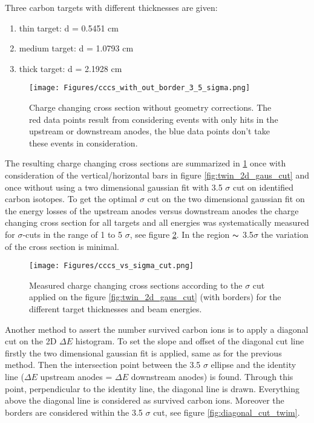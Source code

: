 Three carbon targets with different thicknesses are given:
\begin{enumerate}
\itemsep0em
\item thin target: d = 0.5451 cm
\item medium target: d = 1.0793 cm
\item thick target: d = 2.1928 cm 
\end{enumerate}
\begin{figure}[htpb]
    \centering
    \texttt{[image: Figures/cccs\_with\_out\_border\_3\_5\_sigma.png]}
    \caption{
    Charge changing cross section without geometry corrections. The red data points result from considering events with only hits in the upstream or downstream anodes, the blue data points don't take these events in consideration. 
     }
    \label{fig:cccs_with_out_border_3_5}
\end{figure}
The resulting charge changing cross sections are summarized in \ref{fig:cccs_with_out_border_3_5} once with consideration of the vertical/horizontal bars in figure \ref{fig:twin_2d_gaus_cut} and once without using a two dimensional gaussian fit with 3.5 $\sigma$ cut  on identified carbon isotopes. 
To get the optimal $\sigma$ cut on the two dimensional gaussian fit on the energy losses of the upstream anodes versus downstream anodes the charge changing cross section for all targets and all energies was systematically measured for $\sigma$-cuts in the range of 1 to 5 $\sigma$, see figure \ref{fig:cccs_vs_sigma_cut}. In the region $\thicksim$ 3.5$\sigma$ the variation of the cross section is minimal.
\begin{figure}[htpb]
    \centering
    \texttt{[image: Figures/cccs\_vs\_sigma\_cut.png]}
    \caption{
    Measured charge changing cross sections according to the $\sigma$ cut applied on the figure \ref{fig:twin_2d_gaus_cut} (with borders) for the different target thicknesses and beam energies.
     }
    \label{fig:cccs_vs_sigma_cut}
\end{figure}
Another method to assert the number survived carbon ions is to apply a diagonal cut on the 2D $\Delta E$ histogram. To set the slope and offset of the diagonal cut line firstly the two dimensional gaussian fit is applied, same as for the previous method. Then the intersection point between the 3.5 $\sigma$ ellipse and the identity line ($\Delta E$ upstream anodes = $\Delta E$ downstream anodes) is found. Through this point, perpendicular to the identity line, the diagonal line is drawn. Everything above the diagonal line is considered as survived carbon ions. Moreover the borders are considered within the 3.5 $\sigma$ cut, see figure \ref{fig:diagonal_cut_twim}. 
